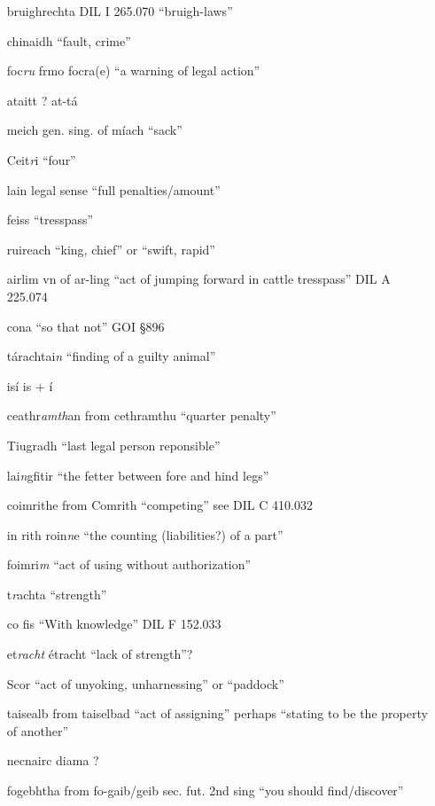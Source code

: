 \documentclass[11pt]{article}
\begin{document}
\begin{enumerate}
  \item[bruighrechta] DIL I 265.070 \enquote{bruigh-laws}
  \item[chinaidh] \enquote{fault, crime}
  \item[foc\emph{ru}] frmo focra(e) \enquote{a warning of legal action}
  \item[ataitt] ? at-t\'{a}
  \item[meich] gen. sing. of m\'{i}ach \enquote{sack}
  \item[Ceit\emph{r}i] \enquote{four}
  \item[lain] legal sense \enquote{full penalties/amount}
  \item[feiss] \enquote{tresspass}
  \item[ruireach] \enquote{king, chief} or \enquote{swift, rapid}
  \item[airlim] vn of ar-ling \enquote{act of jumping forward in cattle tresspass} DIL A 225.074
  \item[cona] \enquote{so that not} GOI \S 896
  \item[t\'{a}rachtai\emph{n}] \enquote{finding of a guilty animal}
  \item[is\'{i}] is + \'{i}
  \item[ceathr\emph{amth}an] from cethramthu \enquote{quarter penalty}
  \item[Tiugradh] \enquote{last legal person reponsible}
  \item[lai\emph{n}gfitir] \enquote{the fetter between fore and hind legs}
  \item[coimrithe] from Comrith \enquote{competing} see DIL C 410.032
  \item[in rith roin\emph{n}e] \enquote{the counting (liabilities?) of a part}
  \item[foimri\emph{m}] \enquote{act of using without authorization}
  \item[t\emph{r}achta] \enquote{strength}
  \item[co fis] \enquote{With knowledge} DIL F 152.033
  \item[et\emph{racht}] \'{e}tracht \enquote{lack of strength}?
  \item[Scor] \enquote{act of unyoking, unharnessing} or \enquote{paddock}
  \item[taisealb] from taiselbad \enquote{act of assigning} perhaps \enquote{stating to be the property of another}
  \item[necnairc diama] ?
  \item[fogebhtha] from fo-gaib/geib sec. fut. 2nd sing \enquote{you should find/discover}

\end{enumerate}
\end{document}
